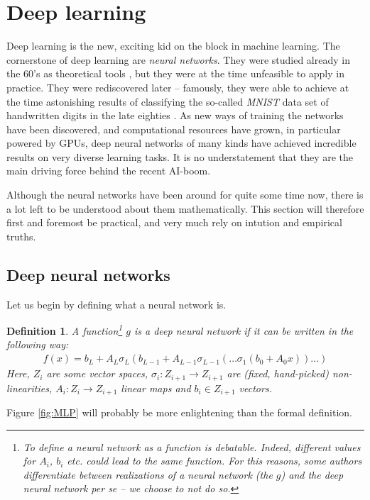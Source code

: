 \documentclass{article}
\newtheorem{defi}{Definition}
\begin{document}
\section{Deep learning}
Deep learning is the new, exciting kid on the block in machine learning. The cornerstone of deep learning are \emph{neural networks}. They were studied already in the 60's as theoretical tools \cite{widrow199030}, but they were at the time unfeasible to apply in practice. They were rediscovered later  -- famously, they were able to achieve at the time astonishing results of classifying the so-called \emph{MNIST} data set of handwritten digits in the late eighties \cite{lecun1989handwritten}. As new ways of training the networks have been discovered, and computational resources have grown, in particular powered by GPUs, deep neural networks of many kinds have achieved incredible results on very diverse learning tasks. It is no understatement that they are the main driving force behind the recent AI-boom.

Although the neural networks have been around for quite some time now, there is a lot left to be understood about them mathematically. This section will therefore first and foremost be practical, and very much rely on intution and empirical truths.


\subsection{Deep neural networks}
Let us begin by defining what a neural network is.
\begin{defi} A function\footnote{To define a neural network as a function is debatable. Indeed, different values for $A_i$, $b_i$ etc. could lead to the same function. For this reasons, some authors differentiate between \emph{realizations} of a neural network (the $g$) and the deep neural network per se -- we choose to not do so.} $g$ is a \emph{deep neural network} if it can be written in the following way:
\begin{align*}
    f(x) = b_{L}+A_L\sigma_L(b_{L-1}+ A_{L-1}\sigma_{L-1}(\dots \sigma_1(b_0+A_0x))\dots)
\end{align*}
Here,  $Z_i$ are some vector spaces, $\sigma_i: Z_{i+1} \to Z_{i+1}$ are (fixed, hand-picked) non-linearities, $A_i: Z_i \to Z_{i+1}$ linear maps and $b_i \in Z_{i+1}$ vectors.
\end{defi}
Figure \ref{fig:MLP} will probably be more enlightening than the formal definition. 
\end{document}
